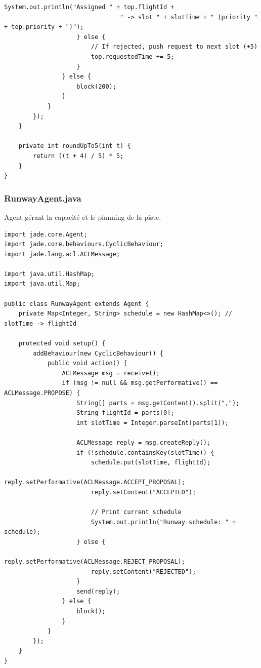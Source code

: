\documentclass[12pt,a4paper]{article}
\begin{document}
\begin{lstlisting}[caption=ControllerAgent.java]
                        System.out.println("Assigned " + top.flightId +
                                " -> slot " + slotTime + " (priority " + top.priority + ")");
                    } else {
                        // If rejected, push request to next slot (+5)
                        top.requestedTime += 5;
                    }
                } else {
                    block(200);
                }
            }
        });
    }

    private int roundUpTo5(int t) {
        return ((t + 4) / 5) * 5;
    }
}
\end{lstlisting}

\subsubsection{RunwayAgent.java}

Agent gérant la capacité et le planning de la piste.

\begin{lstlisting}[caption=RunwayAgent.java]
import jade.core.Agent;
import jade.core.behaviours.CyclicBehaviour;
import jade.lang.acl.ACLMessage;

import java.util.HashMap;
import java.util.Map;

public class RunwayAgent extends Agent {
    private Map<Integer, String> schedule = new HashMap<>(); // slotTime -> flightId

    protected void setup() {
        addBehaviour(new CyclicBehaviour() {
            public void action() {
                ACLMessage msg = receive();
                if (msg != null && msg.getPerformative() == ACLMessage.PROPOSE) {
                    String[] parts = msg.getContent().split(",");
                    String flightId = parts[0];
                    int slotTime = Integer.parseInt(parts[1]);

                    ACLMessage reply = msg.createReply();
                    if (!schedule.containsKey(slotTime)) {
                        schedule.put(slotTime, flightId);
                        reply.setPerformative(ACLMessage.ACCEPT_PROPOSAL);
                        reply.setContent("ACCEPTED");

                        // Print current schedule
                        System.out.println("Runway schedule: " + schedule);
                    } else {
                        reply.setPerformative(ACLMessage.REJECT_PROPOSAL);
                        reply.setContent("REJECTED");
                    }
                    send(reply);
                } else {
                    block();
                }
            }
        });
    }
}
\end{lstlisting}
\end{document}
